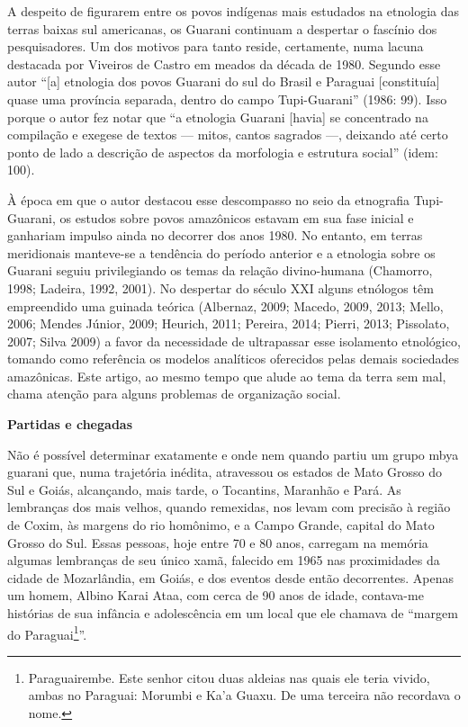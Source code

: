 A despeito de figurarem entre os povos indígenas mais estudados na
etnologia das terras baixas sul americanas, os Guarani continuam a
despertar o fascínio dos pesquisadores. Um dos motivos para tanto
reside, certamente, numa lacuna destacada por Viveiros de Castro em
meados da década de 1980. Segundo esse autor ``{[}a{]} etnologia dos
povos Guarani do sul do Brasil e Paraguai {[}constituía{]} quase uma
província separada, dentro do campo Tupi-Guarani'' (1986: 99). Isso
porque o autor fez notar que ``a etnologia Guarani {[}havia{]} se
concentrado na compilação e exegese de textos --- mitos, cantos sagrados
---, deixando até certo ponto de lado a descrição de aspectos da
morfologia e estrutura social'' (idem: 100).

À época em que o autor destacou esse descompasso no seio da etnografia
Tupi-Guarani, os estudos sobre povos amazônicos estavam em sua fase
inicial e ganhariam impulso ainda no decorrer dos anos 1980. No entanto,
em terras meridionais manteve-se a tendência do período anterior e a
etnologia sobre os Guarani seguiu privilegiando os temas da relação
divino-humana (Chamorro, 1998; Ladeira, 1992, 2001). No despertar do
século XXI alguns etnólogos têm empreendido uma guinada teórica
(Albernaz, 2009; Macedo, 2009, 2013; Mello, 2006; Mendes Júnior, 2009;
Heurich, 2011; Pereira, 2014; Pierri, 2013; Pissolato, 2007; Silva 2009)
a favor da necessidade de ultrapassar esse isolamento etnológico,
tomando como referência os modelos analíticos oferecidos pelas demais
sociedades amazônicas. Este artigo, ao mesmo tempo que alude ao tema da
terra sem mal, chama atenção para alguns problemas de organização
social.

\textbf{Partidas e chegadas}

Não é possível determinar exatamente e onde nem quando partiu um grupo
mbya guarani que, numa trajetória inédita, atravessou os estados de Mato
Grosso do Sul e Goiás, alcançando, mais tarde, o Tocantins, Maranhão e
Pará. As lembranças dos mais velhos, quando remexidas, nos levam com
precisão à região de Coxim, às margens do rio homônimo, e a Campo
Grande, capital do Mato Grosso do Sul. Essas pessoas, hoje entre 70 e 80
anos, carregam na memória algumas lembranças de seu único xamã, falecido
em 1965 nas proximidades da cidade de Mozarlândia, em Goiás, e dos
eventos desde então decorrentes. Apenas um homem, Albino Karai Ataa, com
cerca de 90 anos de idade, contava-me histórias de sua infância e
adolescência em um local que ele chamava de ``margem do
Paraguai\footnote{Paraguairembe. Este senhor citou duas aldeias nas
  quais ele teria vivido, ambas no Paraguai: Morumbi e Ka'a Guaxu. De
  uma terceira não recordava o nome.}''.


